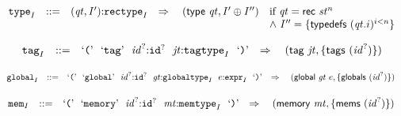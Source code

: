 \vspace{1ex}

$$
\begin{array}[t]{@{}lrrl@{}l@{}l@{}l@{}}
& {{\mathtt{type}}}_{I} & ::= & ({\mathit{qt}}, {I'}){:}{{\mathtt{rectype}}}_{I} & \quad\Rightarrow\quad{} & (\mathsf{type}~{\mathit{qt}}, {I'} \oplus {I''}) & \quad
\begin{array}[t]{@{}l@{}}
\mbox{if}~ {\mathit{qt}} = \mathsf{rec}~{{\mathit{st}}^{n}} \\
{\land}~ {I''} = \{ \mathsf{typedefs}~{({\mathit{qt}} {.} i)^{i<n}} \} \\
\end{array} \\
\end{array}
$$

\vspace{1ex}

$$
\begin{array}[t]{@{}lrrl@{}l@{}l@{}l@{}}
& {{\mathtt{tag}}}_{I} & ::= & \mbox{‘\texttt{{(}}’}~~\mbox{‘\texttt{tag}’}~~{{\mathit{id}}^?}{:}{{\mathtt{id}}^?}~~{\mathit{jt}}{:}{{\mathtt{tagtype}}}_{I}~~\mbox{‘\texttt{{)}}’} & \quad\Rightarrow\quad{} & (\mathsf{tag}~{\mathit{jt}}, \{ \mathsf{tags}~({{\mathit{id}}^?}) \}) \\
\end{array}
$$

\vspace{1ex}

$$
\begin{array}[t]{@{}lrrl@{}l@{}l@{}l@{}}
& {{\mathtt{global}}}_{I} & ::= & \mbox{‘\texttt{{(}}’}~~\mbox{‘\texttt{global}’}~~{{\mathit{id}}^?}{:}{{\mathtt{id}}^?}~~{\mathit{gt}}{:}{{\mathtt{globaltype}}}_{I}~~e{:}{{\mathtt{expr}}}_{I}~~\mbox{‘\texttt{{)}}’} & \quad\Rightarrow\quad{} & (\mathsf{global}~{\mathit{gt}}~e, \{ \mathsf{globals}~({{\mathit{id}}^?}) \}) \\
\end{array}
$$

\vspace{1ex}

$$
\begin{array}[t]{@{}lrrl@{}l@{}l@{}l@{}}
& {{\mathtt{mem}}}_{I} & ::= & \mbox{‘\texttt{{(}}’}~~\mbox{‘\texttt{memory}’}~~{{\mathit{id}}^?}{:}{{\mathtt{id}}^?}~~{\mathit{mt}}{:}{{\mathtt{memtype}}}_{I}~~\mbox{‘\texttt{{)}}’} & \quad\Rightarrow\quad{} & (\mathsf{memory}~{\mathit{mt}}, \{ \mathsf{mems}~({{\mathit{id}}^?}) \}) \\
\end{array}
$$

